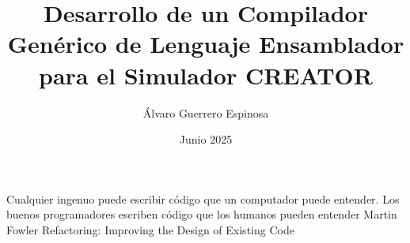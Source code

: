 \documentclass[es]{uc3mthesisIEEE}
\title{Desarrollo de un Compilador Genérico de Lenguaje Ensamblador para el Simulador CREATOR}
\author{Álvaro Guerrero Espinosa}
\date{Junio 2025}
\begin{document}
  \makecover


  \makeepigraph
    {Cualquier ingenuo puede escribir código que un computador puede entender. Los buenos programadores escriben código que los humanos pueden entender}  %
    {Martin Fowler}  %
    {Refactoring: Improving the Design of Existing Code}  %


  \begin{acknowledgements}
  \end{acknowledgements}


  \begin{abstract}
    \lipsum[1-3]
  \end{abstract}


  \tableofcontents
  \listoffigures
  \listoftables


  \begin{thesis}
  \end{thesis}


  \cleardoublepage
  \label{bibliography}
  \printbibliography[heading=bibintoc]


  \cleardoublepage
  \label{glossary}
  \printglossaries


\end{document}
